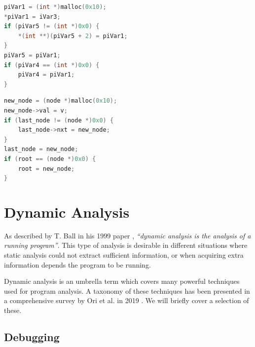 \begin{center}

\begin{minipage}[5]{0.45\textwidth}
\begin{lstlisting}[language=c, label={code:decompilation-1}, caption={Ghidra decompilation of the code presented in Listing \ref{code:decompilation-original}. The decompilation is take as-is and has not modified in any way.}]
piVar1 = (int *)malloc(0x10);
*piVar1 = iVar3;
if (piVar5 != (int *)0x0) {
    *(int **)(piVar5 + 2) = piVar1;
}
piVar5 = piVar1;
if (piVar4 == (int *)0x0) {
    piVar4 = piVar1;
}
\end{lstlisting}
\end{minipage}
\hspace{1.3cm}
\begin{minipage}[5]{0.45\textwidth}
\begin{lstlisting}[language=c, label={code:decompilation-2}, caption={Ghidra decompilation of the code presented in Listing \ref{code:decompilation-original}. The decompilation has been modified by renaming variabled and changing data types, based on educated guesses.}]
new_node = (node *)malloc(0x10);
new_node->val = v;
if (last_node != (node *)0x0) {
    last_node->nxt = new_node;
}
last_node = new_node;
if (root == (node *)0x0) {
    root = new_node;
}
\end{lstlisting}
\end{minipage}

\end{center}

\section{Dynamic Analysis}

As described by T. Ball in his 1999 paper \cite{concept_of_da_1999}, \emph{``dynamic analysis is the analysis of a running program''}. This type of analysis is desirable in different situations where static analysis could not extract sufficient information, or when acquiring extra information depends the program to be running.

Dynamic analysis is an umbrella term which covers many powerful techniques used for program analysis. A taxonomy of these techniques has been presented in a comprehensive survey by Ori et al. in 2019 \cite{da_survey_2019}. We will briefly cover a selection of these.

\subsection{Debugging}

